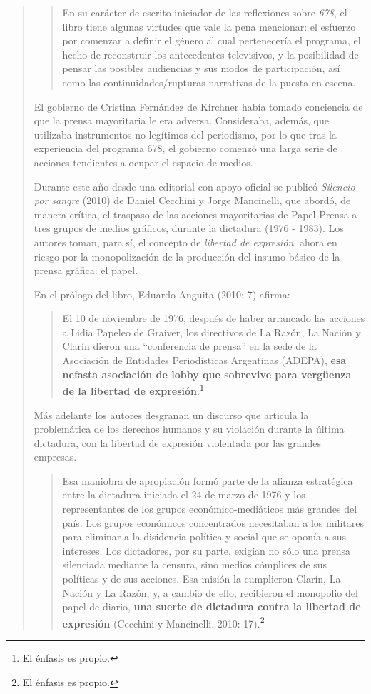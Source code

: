 {\begin{quote}
\begin{quote}
En su carácter de escrito iniciador de las reflexiones sobre \emph{678}, el libro tiene algunas virtudes que vale la pena mencionar: el esfuerzo por comenzar a definir el género al cual pertenecería el programa, el hecho de reconstruir los antecedentes televisivos, y la posibilidad de pensar las posibles audiencias y sus modos de participación, así como las continuidades/rupturas narrativas de la puesta en escena.
\end{quote}

El gobierno de Cristina Fernández de Kirchner había tomado conciencia de que la prensa mayoritaria le era adversa. Consideraba, además, que utilizaba instrumentos no legítimos del periodismo, por lo que tras la experiencia del programa 678, el gobierno comenzó una larga serie de acciones tendientes a ocupar el espacio de medios.

Durante este año desde una editorial con apoyo oficial se publicó \emph{Silencio por sangre} (2010) de Daniel Cecchini y Jorge Mancinelli, que abordó, de manera crítica, el traspaso de las acciones mayoritarias de Papel Prensa a tres grupos de medios gráficos, durante la dictadura (1976 - 1983). Los autores toman, para sí, el concepto de \emph{libertad de expresión}, ahora en riesgo por la monopolización de la producción del insumo básico de la prensa gráfica: el papel.

En el prólogo del libro, Eduardo Anguita (2010: 7) afirma:

\begin{quote}
El 10 de noviembre de 1976, después de haber arrancado las acciones a Lidia Papeleo de Graiver, los directivos de La Razón, La Nación y Clarín dieron una \enquote{conferencia de prensa} en la sede de la Asociación de Entidades Periodísticas Argentinas (ADEPA), \textbf{esa nefasta asociación de lobby que sobrevive para vergüenza de la libertad de expresión}.\footnote{El énfasis es propio.}
\end{quote}

Más adelante los autores desgranan un discurso que articula la problemática de los derechos humanos y su violación durante la última dictadura, con la libertad de expresión violentada por las grandes empresas.

\begin{quote}
Esa maniobra de apropiación formó parte de la alianza estratégica entre la dictadura iniciada el 24 de marzo de 1976 y los representantes de los grupos económico-mediáticos más grandes del país. Los grupos económicos concentrados necesitaban a los militares para eliminar a la disidencia política y social que se oponía a sus intereses. Los dictadores, por su parte, exigían no sólo una prensa silenciada mediante la censura, sino medios cómplices de sus políticas y de sus acciones. Esa misión la cumplieron Clarín, La Nación y La Razón, y, a cambio de ello, recibieron el monopolio del papel de diario, \textbf{una suerte de dictadura contra la libertad de expresión} (Cecchini y Mancinelli, 2010: 17).\footnote{El énfasis es propio.}
\end{quote}


\end{quote}}
